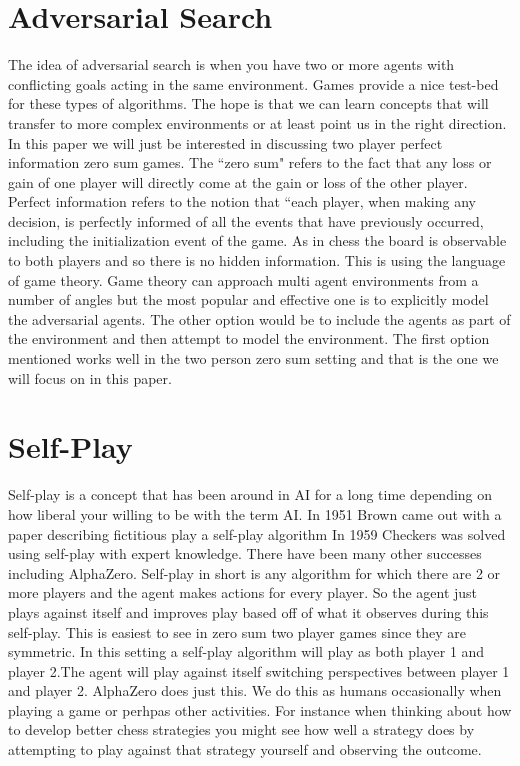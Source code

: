 
    \section{Adversarial Search}

The idea of adversarial search is when you have two or more agents with conflicting goals acting in the same environment. Games provide a nice test-bed for these types of algorithms. The hope is that we can learn concepts that will transfer to more complex environments or at least point us in the right direction. In this paper we will just be interested in discussing two player perfect information zero sum games. The ``zero sum" refers to the fact that any loss or gain of one player will directly come at the gain or loss of the other player. Perfect information refers to the notion that ``each player, when making any decision, is perfectly informed of all the events that have previously occurred, including the initialization event of the game. As in chess the board is observable to both players and so there is no hidden information. This is using the language of game theory. Game theory can approach multi agent environments from a number of angles but the most popular and effective one is to explicitly model the adversarial agents. The other option would be to include the agents as part of the environment and then attempt to model the environment. The first option mentioned works well in the two person zero sum setting and that is the one we will focus on in this paper. 

\section{Self-Play}

Self-play is a concept that has been around in AI for a long time depending on how liberal your willing to be with the term AI. In 1951 Brown came out with a paper describing fictitious play a self-play algorithm In 1959 Checkers was solved using self-play with expert knowledge. There have been many other successes including AlphaZero. Self-play in short is any algorithm for which there are 2 or more players and the agent makes actions for every player. So the agent just plays against itself and improves play based off of what it observes during this self-play. This is easiest to see in zero sum two player games since they are symmetric. In this setting a self-play algorithm will play as both player 1 and player 2.The agent will play against itself switching perspectives between player 1 and player 2. AlphaZero does just this. We do this as humans occasionally when playing a game or perhpas other activities. For instance when thinking about how to develop better chess strategies you might see how well a strategy does by attempting to play against that strategy yourself and observing the outcome. 


